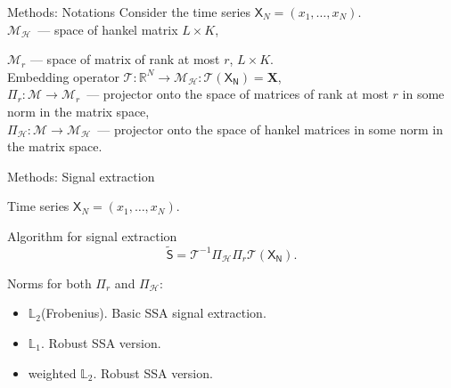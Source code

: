 \documentclass[ucs, notheorems, handout]{beamer}
\newcommand{\tX}[1]{\mathsf{#1}}
\begin{document}
\begin{frame}{Methods: Notations}
Consider the time series $\tX{X}_N=(x_1, \ldots, x_{N})$.\\
\vspace{1em}
$\mathcal{M}_{\mathcal{H}}$~--- space of hankel matrix $L\times K$,

$\mathcal{M}_{r}$ --- space of matrix of rank at most $r$,  $L \times K$.\\
\vspace{1em}
Embedding operator $\mathcal{T}:\mathbb{R}^N \rightarrow \mathcal{M}_{\mathcal{H}}: \mathcal{T} (\tX{X_N}) = \mathbf{X} $,\\
\vspace{1em}
$\Pi_{r}:\mathcal{M}\rightarrow \mathcal{M}_r$~--- projector onto the space of matrices of rank at most $r$ in some norm in the matrix space,\\
\vspace{1em}
$\Pi_{\mathcal{H}}:\mathcal{M} \rightarrow \mathcal{M}_{\mathcal{H}}$~--- projector onto the space of hankel matrices in some norm in the matrix space.

    \note{}

\end{frame}

\begin{frame}{Methods: Signal extraction}

Time series $\tX{X}_N=(x_1, \ldots, x_{N})$.
\begin{block}{Algorithm for signal extraction}
\begin{equation*}
	\tilde{\tX{S}} = \mathcal{T}^{-1} \Pi_{\mathcal{H}} \Pi_{r} \mathcal{T} (\tX{X_N}).
\end{equation*}
\end{block}


Norms for both $\Pi_r$ and $\Pi_{\mathcal{H}}$:
\begin{itemize}
        \item $\mathbb{L}_2$(Frobenius). Basic SSA signal extraction.
        \item $\mathbb{L}_1$. Robust SSA version.
        \item weighted $\mathbb{L}_2$. Robust SSA version.
\end{itemize}
    \note{}
\end{frame}
\end{document}
